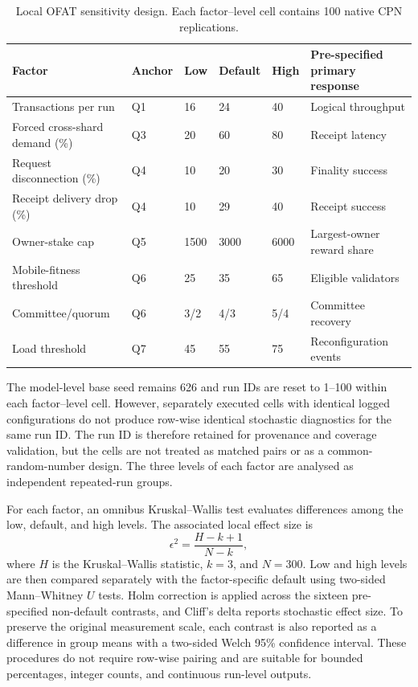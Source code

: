 \documentclass[a4paper,fleqn]{cas-sc}
\begin{document}
\begin{table}[pos=t]
\centering
\caption{Local OFAT sensitivity design. Each factor--level cell contains 100
native CPN replications.}
\label{tab:sensitivity_design}
\scriptsize
\setlength{\tabcolsep}{3.0pt}
\renewcommand{\arraystretch}{1.10}
\begin{tabularx}{\textwidth}{p{2.8cm}p{0.9cm}p{1.35cm}p{1.35cm}p{1.35cm}X}
\toprule
\textbf{Factor} & \textbf{Anchor} & \textbf{Low} & \textbf{Default} &
\textbf{High} & \textbf{Pre-specified primary response}\\
\midrule
Transactions per run & Q1 & 16 & 24 & 40 & Logical throughput\\
Forced cross-shard demand (\%) & Q3 & 20 & 60 & 80 & Receipt latency\\
Request disconnection (\%) & Q4 & 10 & 20 & 30 & Finality success\\
Receipt delivery drop (\%) & Q4 & 10 & 29 & 40 & Receipt success\\
Owner-stake cap & Q5 & 1500 & 3000 & 6000 & Largest-owner reward share\\
Mobile-fitness threshold & Q6 & 25 & 35 & 65 & Eligible validators\\
Committee/quorum & Q6 & 3/2 & 4/3 & 5/4 & Committee recovery\\
Load threshold & Q7 & 45 & 55 & 75 & Reconfiguration events\\
\bottomrule
\end{tabularx}
\end{table}

The model-level base seed remains 626 and run IDs are reset to 1--100 within
each factor--level cell. However, separately executed cells with identical
logged configurations do not produce row-wise identical stochastic
diagnostics for the same run ID. The run ID is therefore retained for
provenance and coverage validation, but the cells are not treated as matched
pairs or as a common-random-number design. The three levels of each factor are
analysed as independent repeated-run groups.

For each factor, an omnibus Kruskal--Wallis test evaluates differences among
the low, default, and high levels. The associated local effect size is
\begin{equation}
\epsilon^2=\frac{H-k+1}{N-k},
\label{eq:sensitivity_epsilon}
\end{equation}
where $H$ is the Kruskal--Wallis statistic, $k=3$, and $N=300$. Low and high
levels are then compared separately with the factor-specific default using
two-sided Mann--Whitney $U$ tests. Holm correction is applied across the
sixteen pre-specified non-default contrasts, and Cliff's delta reports
stochastic effect size. To preserve the original measurement scale, each
contrast is also reported as a difference in group means with a two-sided
Welch 95\% confidence interval. These procedures do not require row-wise
pairing and are suitable for bounded percentages, integer counts, and
continuous run-level outputs.
\end{document}
